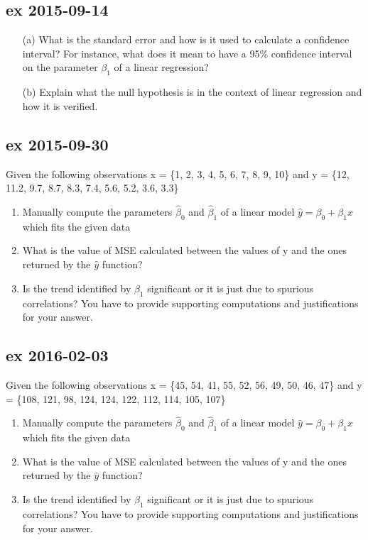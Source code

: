 \documentclass[a4paper,12pt,titlepage]{article} %
\begin{document}
\subsection{ex 2015-09-14}
\begin{itemize}
\item[(a)] What is the standard error and how is it used to calculate a confidence interval? For instance, what does it mean to have a 95\% confidence interval on the parameter $ \beta_{1} $ of a linear regression?
\item[(b)] Explain what the null hypothesis is in the context of linear regression and how it is
verified.
\end{itemize}

\subsection{ex 2015-09-30}
Given the following observations x = \{1, 2, 3, 4, 5, 6, 7, 8, 9, 10\} and y = \{12, 11.2, 9.7, 8.7, 8.3, 7.4, 5.6, 5.2, 3.6, 3.3\}
\begin{enumerate}
\item Manually compute the parameters $ \hat{\beta}_{0} $ and $ \hat{\beta}_{1} $ of a linear model $ \hat{y} = \beta_{0} + \beta_{1} x $ which fits the given data
\item What is the value of MSE calculated between the values of y and the ones returned by the $ \hat{y} $ function?
\item Is the trend identified by $ \hat{\beta}_{1} $ significant or it is just due to spurious correlations? You have to provide supporting computations and justifications for your answer. 
\end{enumerate}

\subsection{ex 2016-02-03}
Given the following observations x = \{45, 54, 41, 55, 52, 56, 49, 50, 46, 47\} and y = \{108, 121, 98, 124, 124, 122, 112, 114, 105, 107\}
\begin{enumerate}
\item Manually compute the parameters $ \hat{\beta}_{0} $ and $ \hat{\beta}_{1} $ of a linear model $ \hat{y} = \beta_{0} + \beta_{1} x $ which fits the given data
\item What is the value of MSE calculated between the values of y and the ones returned by the $ \hat{y} $ function?
\item Is the trend identified by $ \hat{\beta}_{1} $ significant or it is just due to spurious correlations? You have to provide supporting computations and justifications for your answer. 
\end{enumerate}
\end{document}
